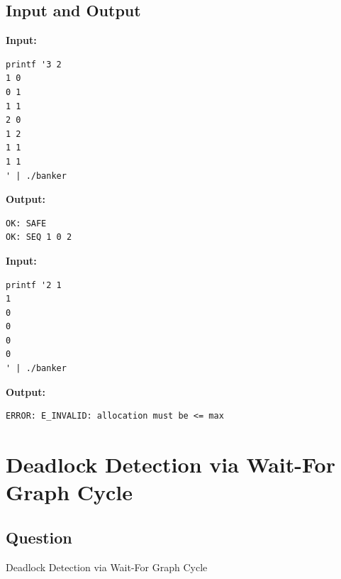 \documentclass[12pt,a4paper]{article}
\begin{document}
\subsection{Input and Output}
\noindent\textbf{Input:}
\begin{verbatim}
printf '3 2
1 0
0 1
1 1
2 0
1 2
1 1
1 1
' | ./banker
\end{verbatim}
\vspace{0.5cm}
\noindent\textbf{Output:}
\begin{verbatim}
OK: SAFE
OK: SEQ 1 0 2
\end{verbatim}
\noindent\textbf{Input:}
\begin{verbatim}
printf '2 1
1
0
0
0
0
' | ./banker
\end{verbatim}
\vspace{0.5cm}
\noindent\textbf{Output:}
\begin{verbatim}
ERROR: E_INVALID: allocation must be <= max
\end{verbatim}
\newpage
\section{Deadlock Detection via Wait-For Graph Cycle}
\subsection{Question}
Deadlock Detection via Wait-For Graph Cycle
\end{document}
